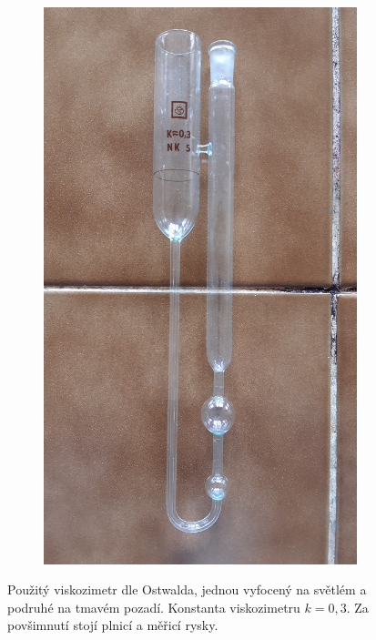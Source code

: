 \documentclass[12pt]{article}
\begin{document}
\begin{figure}[h!]
\begin{subfigure}[b]{.5\textwidth}
        \includegraphics[angle = 270, width = \textwidth]{prilohy/muj_ostwald2.jpg}
    \end{subfigure}
    \caption{Použitý viskozimetr dle Ostwalda, jednou vyfocený na světlém a podruhé na tmavém pozadí. Konstanta viskozimetru $k = 0,3$. Za povšimnutí stojí plnicí a měřicí rysky.}
    \label{fig:muj_ostwald}
\end{figure}
\end{document}
